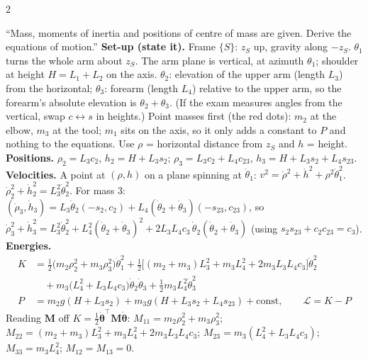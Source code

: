 \begin{multicols}{2}
\begin{examq}
``Mass, moments of inertia and positions of centre of mass are given. Derive the equations of motion.''
\solution
\textbf{Set-up (state it).} Frame $\{S\}$: $z_S$ up, gravity along $-z_S$. $\theta_1$ turns the whole arm about $z_S$. The arm plane is vertical, at azimuth $\theta_1$; shoulder at height $H=L_1+L_2$ on the axis. $\theta_2$: elevation of the upper arm (length $L_3$) from the horizontal; $\theta_3$: forearm (length $L_4$) relative to the upper arm, so the forearm's absolute elevation is $\theta_2+\theta_3$. (If the exam measures angles from the vertical, swap $c\leftrightarrow s$ in heights.) Point masses first (the red dots): $m_2$ at the elbow, $m_3$ at the tool; $m_1$ sits on the axis, so it only adds a constant to $P$ and nothing to the equations. Use $\rho$ = horizontal distance from $z_S$ and $h$ = height.\\
\textbf{Positions.} $\rho_2=L_3c_2$, $h_2=H+L_3s_2$; $\rho_3=L_3c_2+L_4c_{23}$, $h_3=H+L_3s_2+L_4s_{23}$.\\
\textbf{Velocities.} A point at $(\rho,h)$ on a plane spinning at $\dot\theta_1$: $v^2=\dot\rho^2+\dot h^2+\rho^2\dot\theta_1^2$. $\dot\rho_2^2+\dot h_2^2=L_3^2\dot\theta_2^2$. For mass 3: $(\dot\rho_3,\dot h_3)=L_3\dot\theta_2(-s_2,c_2)+L_4(\dot\theta_2+\dot\theta_3)(-s_{23},c_{23})$, so $\dot\rho_3^2+\dot h_3^2=L_3^2\dot\theta_2^2+L_4^2(\dot\theta_2+\dot\theta_3)^2+2L_3L_4c_3\,\dot\theta_2(\dot\theta_2+\dot\theta_3)$ (using $s_2s_{23}+c_2c_{23}=c_3$).\\
\textbf{Energies.}
\begin{align*}K&=\tfrac12\big(m_2\rho_2^2+m_3\rho_3^2\big)\dot\theta_1^2+\tfrac12\big[(m_2+m_3)L_3^2+m_3L_4^2+2m_3L_3L_4c_3\big]\dot\theta_2^2\\&\quad+m_3\big(L_4^2+L_3L_4c_3\big)\dot\theta_2\dot\theta_3+\tfrac12m_3L_4^2\dot\theta_3^2\\
P&=m_2g(H+L_3s_2)+m_3g(H+L_3s_2+L_4s_{23})+\text{const},\qquad \mathcal L=K-P\end{align*}
Reading $\mathbf M$ off $K=\tfrac12\dot{\boldsymbol\theta}^\top\mathbf M\dot{\boldsymbol\theta}$: $M_{11}=m_2\rho_2^2+m_3\rho_3^2$; $M_{22}=(m_2+m_3)L_3^2+m_3L_4^2+2m_3L_3L_4c_3$; $M_{23}=m_3(L_4^2+L_3L_4c_3)$; $M_{33}=m_3L_4^2$; $M_{12}=M_{13}=0$.

\end{examq}
\end{multicols}
